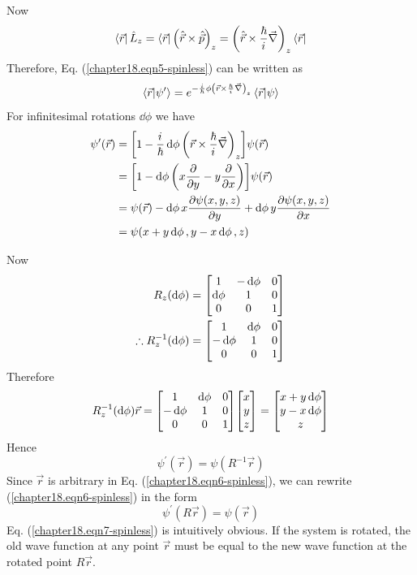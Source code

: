 Now
\begin{equation*}
\bra{\vec{r}} \hat{L}_z = \bra{\vec{r}} \qty(\hat{\vec{r}} \times \hat{\vec{p}})_z = \qty(\hat{\vec{r}} \times \frac{\hbar}{{i\mkern1mu}} \vec{\nabla})_z \bra{\vec{r}}
\end{equation*}
Therefore, Eq. (\ref{chapter18.eqn5-spinless}) can be written as
\begin{equation}
\braket{\vec{r}}{\psi^\prime} = e^{-\frac{{i\mkern1mu}}{\hbar} \phi \qty(\vec{r} \times \frac{\hbar}{{i\mkern1mu}} \vec{\nabla})_z} \braket{\vec{r}}{\psi}
\end{equation}
For infinitesimal rotations $\dd{\phi}$ we have
\begin{align*}
\psi^\prime\qty(\vec{r}) 
&= \qty[1 - \frac{{i\mkern1mu}}{\hbar} \dd{\phi} \qty(\vec{r} \times \frac{\hbar}{{i\mkern1mu}} \vec{\nabla})_z] \psi\qty(\vec{r}) \\
&= \qty[1 - \dd{\phi} \qty(x \pdv{}{y} - y \pdv{}{x})] \psi\qty(\vec{r}) \\
&= \psi\qty(\vec{r}) - \dd{\phi} x \pdv{\psi(x,y,z)}{y} + \dd{\phi} y \pdv{\psi(x,y,z)}{x} \\
&= \psi\qty(x + y\dd{\phi}, y - x \dd{\phi}, z)
\end{align*}

Now
\begin{align}
\label{chapter18.eqn1.infinitesimal-3d}
R_z(\dd{\phi}) &= \mqty[1 & -\dd{\phi} & 0 \\ \dd{\phi} & 1 & 0 \\ 0 & 0 & 1] \\
\label{chapter18.eqn2.infinitesimal-3d}
\therefore R^{-1}_z(\dd{\phi}) &= \mqty[1 & \dd{\phi} & 0 \\ -\dd{\phi} & 1 & 0 \\ 0 & 0 & 1] \\
\end{align}
Therefore
\begin{equation*}
R^{-1}_z(\dd{\phi}) \vec{r} = \mqty[1 & \dd{\phi} & 0 \\ -\dd{\phi} & 1 & 0 \\ 0 & 0 & 1]  \mqty[x\\y\\z] = \mqty[x+y\dd{\phi} \\ y - x\dd{\phi} \\ z]
\end{equation*}
Hence
\begin{equation}
\label{chapter18.eqn6-spinless}
\psi^\prime(\vec{r}) = \psi(R^{-1} \vec{r})
\end{equation}
Since $\vec{r}$ is arbitrary in Eq. (\ref{chapter18.eqn6-spinless}), we can rewrite (\ref{chapter18.eqn6-spinless}) in the form
\begin{equation}
\label{chapter18.eqn7-spinless}
\psi^\prime(R \vec{r}) = \psi(\vec{r})
\end{equation}
Eq. (\ref{chapter18.eqn7-spinless}) is intuitively obvious. If the system is rotated, the old wave function at any point $\vec{r}$ must be equal to the new wave function at the rotated point $R\vec{r}$.

